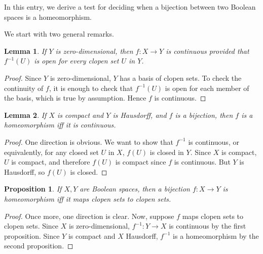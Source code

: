 \documentclass[12pt]{article}
\newtheorem{prop}{Proposition}
\newtheorem{lem}{Lemma}
\begin{document}
In this entry, we derive a test for deciding when a bijection between two Boolean spaces is a homeomorphism.

We start with two general remarks.

\begin{lem}  If $Y$ is zero-dimensional, then $f:X\to Y$ is continuous provided that $f^{-1}(U)$ is open for every clopen set $U$ in $Y$. \end{lem}
\begin{proof}  Since $Y$ is zero-dimensional, $Y$ has a basis of clopen sets.  To check the continuity of $f$, it is enough to check that $f^{-1}(U)$ is open for each member of the basis, which is true by assumption.  Hence $f$ is continuous.
\end{proof}

\begin{lem} If $X$ is compact and $Y$ is Hausdorff, and $f$ is a bijection, then $f$ is a homeomorphism iff it is continuous. \end{lem}
\begin{proof}  One direction is obvious.  We want to show that $f^{-1}$ is continuous, or equivalently, for any closed set $U$ in $X$, $f(U)$ is closed in $Y$.  Since $X$ is compact, $U$ is compact, and therefore $f(U)$ is compact since $f$ is continuous.  But $Y$ is Hausdorff, so $f(U)$ is closed.
\end{proof}

\begin{prop} If $X,Y$ are Boolean spaces, then a bijection $f:X\to Y$ is homeomorphism iff it maps clopen sets to clopen sets.  \end{prop}
\begin{proof} Once more, one direction is clear.  Now, suppose $f$ maps clopen sets to clopen sets.  Since $X$ is zero-dimensional, $f^{-1}:Y\to X$ is continuous by the first proposition.  Since $Y$ is compact and $X$ Hausdorff, $f^{-1}$ is a homeomorphism by the second proposition.
\end{proof}
\end{document}

